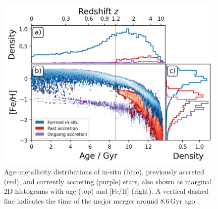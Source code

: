 \documentclass[fleqn,usenatbib]{mnras}
\begin{document}
\begin{figure}
    \centering
    \includegraphics[width=\columnwidth]{figures/tracing_insitu_accretion_3.png}
    \caption{Age–metallicity distributions of in-situ (blue), previously accreted (red), and currently accreting (purple) stars, also shown as marginal 2D histograms with age (top) and [Fe/H] (right). A vertical dashed line indicates the time of the major merger around $8.6\,\mathrm{Gyr}$ ago \href{https://github.com/svenbuder/gse_nihaouhd/tree/main/figures}{\faGithub}.}
    \label{fig:tracing_insitu_accretion_3}
\end{figure}
\end{document}
